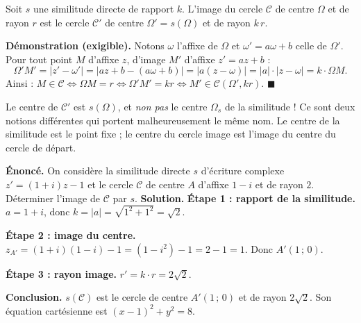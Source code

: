 \documentclass[11pt]{article}
\newcounter{popsec}
\newcounter{popsub}
\newcommand{\courssub}[1]{%
  \stepcounter{popsub}%
  \par\vspace{9pt}\noindent{\popxbold\fontsize{11.5}{13}\selectfont\color{popink}{\color{poporange}\thepopsec.\thepopsub}\hspace{6pt}#1}\par\nopagebreak\vspace{4pt}
}
\begin{document}
\courssub{Image d'un cercle}

\begin{propriete}
Soit $s$ une similitude directe de rapport $k$. L'image du cercle $\mathcal{C}$ de centre $\Omega$ et de rayon $r$ est le cercle $\mathcal{C}'$ de centre $\Omega' = s(\Omega)$ et de rayon $k\,r$.
\end{propriete}

\textbf{Démonstration (exigible).} Notons $\omega$ l'affixe de $\Omega$ et $\omega' = a\omega + b$ celle de $\Omega'$. Pour tout point $M$ d'affixe $z$, d'image $M'$ d'affixe $z' = az + b$ :
\[ \Omega'M' = |z' - \omega'| = |az + b - (a\omega + b)| = |a(z - \omega)| = |a|\cdot|z - \omega| = k \cdot \Omega M. \]
Ainsi : $M \in \mathcal{C} \iff \Omega M = r \iff \Omega'M' = kr \iff M' \in \mathcal{C}(\Omega', kr)$. \hfill $\blacksquare$

\begin{attention}
Le centre de $\mathcal{C}'$ est $s(\Omega)$, et \emph{non pas} le centre $\Omega_s$ de la similitude ! Ce sont deux notions différentes qui portent malheureusement le même nom. Le centre de la similitude est le point fixe ; le centre du cercle image est l'image du centre du cercle de départ.
\end{attention}

\begin{exoresolu}
\textbf{Énoncé.} On considère la similitude directe $s$ d'écriture complexe $z' = (1+i)z - 1$ et le cercle $\mathcal{C}$ de centre $A$ d'affixe $1 - i$ et de rayon $2$. Déterminer l'image de $\mathcal{C}$ par $s$.
\tcblower
\textbf{Solution.} \textbf{Étape 1 : rapport de la similitude.} $a = 1+i$, donc $k = |a| = \sqrt{1^2 + 1^2} = \sqrt{2}$.

\textbf{Étape 2 : image du centre.} $z_{A'} = (1+i)(1-i) - 1 = (1 - i^2) - 1 = 2 - 1 = 1$. Donc $A'(1\,;\,0)$.

\textbf{Étape 3 : rayon image.} $r' = k \cdot r = 2\sqrt{2}$.

\textbf{Conclusion.} $s(\mathcal{C})$ est le cercle de centre $A'(1\,;\,0)$ et de rayon $2\sqrt{2}$. Son équation cartésienne est $(x-1)^2 + y^2 = 8$.
\end{exoresolu}
\end{document}
